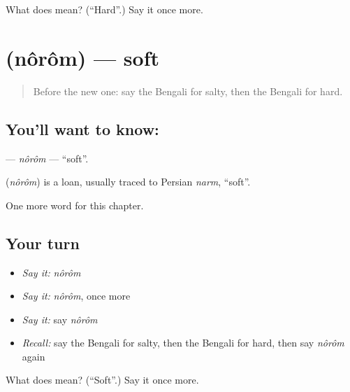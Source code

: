 \begin{tcolorbox}[breakable,colback=teal!4,colframe=teal!35!black,title={Before you move on}]
What does  mean? (\textquotedblleft{}Hard\textquotedblright{}.) Say it once more.
\end{tcolorbox}
\section[\texorpdfstring{\bn{নরম} (nôrôm)}{নরম (nôrôm)}]{ (nôrôm) — soft}

\label{lesson:BN-C134-norom}



\begin{quote}
Before the new one: say the Bengali for salty, then the Bengali for hard.
\end{quote}

\subsection*{You'll want to know: }
\textbf{} — \emph{nôrôm} — \textquotedblleft{}soft\textquotedblright{}.

\begin{cousinweb}
\textbf{} (\emph{nôrôm}) is a loan, usually traced to Persian \emph{narm}, \textquotedblleft{}soft\textquotedblright{}.
\end{cousinweb}

\begin{grammarlens}[title={What you've built}]
One more word for this chapter.
\end{grammarlens}

\subsection*{Your turn}
\begin{itemize}
\raggedright
  \item \emph{Say it:} \emph{nôrôm}
  \item \emph{Say it:} \emph{nôrôm}, once more
  \item \emph{Say it:} say \emph{nôrôm}
  \item \emph{Recall:} say the Bengali for salty, then the Bengali for hard, then say \emph{nôrôm} again
\end{itemize}

\begin{tcolorbox}[breakable,colback=teal!4,colframe=teal!35!black,title={Before you move on}]
What does  mean? (\textquotedblleft{}Soft\textquotedblright{}.) Say it once more.
\end{tcolorbox}

